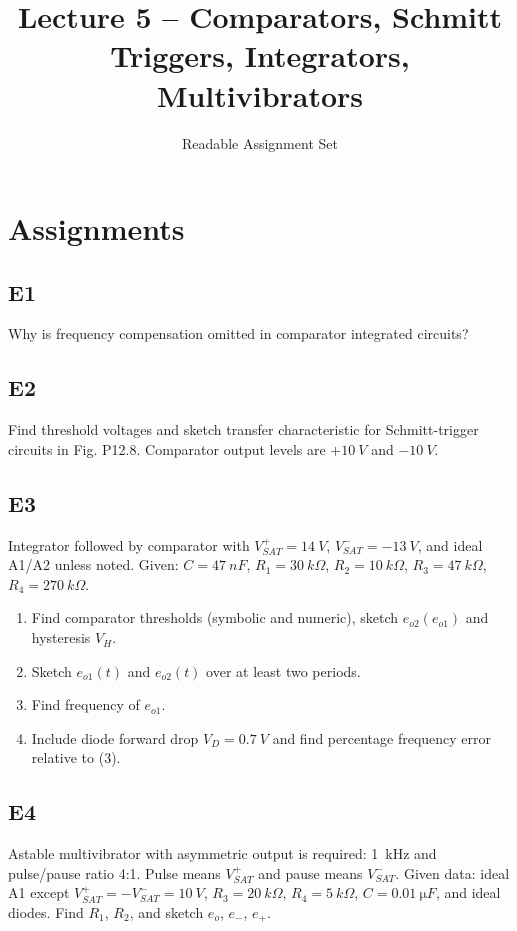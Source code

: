 \documentclass[12pt,a4paper]{article}
\title{Lecture 5 -- Comparators, Schmitt Triggers, Integrators, Multivibrators}
\author{Readable Assignment Set}
\date{}
\begin{document}
\maketitle
\tableofcontents

\section{Assignments}
\subsection{E1}
Why is frequency compensation omitted in comparator integrated circuits?

\subsection{E2}
Find threshold voltages and sketch transfer characteristic for Schmitt-trigger circuits in Fig. P12.8. Comparator output levels are \(+\SI{10}{V}\) and \(-\SI{10}{V}\).

\subsection{E3}
Integrator followed by comparator with $V_{SAT}^+=\SI{14}{V}$, $V_{SAT}^- = \SI{-13}{V}$, and ideal A1/A2 unless noted. Given: 
$C=\SI{47}{nF}$, $R_1=\SI{30}{k\Omega}$, $R_2=\SI{10}{k\Omega}$, $R_3=\SI{47}{k\Omega}$, $R_4=\SI{270}{k\Omega}$.
\begin{enumerate}
\item Find comparator thresholds (symbolic and numeric), sketch $e_{o2}(e_{o1})$ and hysteresis $V_H$.
\item Sketch $e_{o1}(t)$ and $e_{o2}(t)$ over at least two periods.
\item Find frequency of $e_{o1}$.
\item Include diode forward drop $V_D=\SI{0.7}{V}$ and find percentage frequency error relative to (3).
\end{enumerate}

\subsection{E4}
Astable multivibrator with asymmetric output is required: \SI{1}{kHz} and pulse/pause ratio 4:1. Pulse means $V_{SAT}^+$ and pause means $V_{SAT}^-$.
Given data: ideal A1 except $V_{SAT}^+=-V_{SAT}^-=\SI{10}{V}$, $R_3=\SI{20}{k\Omega}$, $R_4=\SI{5}{k\Omega}$, $C=\SI{0.01}{\micro F}$, and ideal diodes.
Find $R_1$, $R_2$, and sketch $e_o$, $e_-$, $e_+$.
\end{document}
